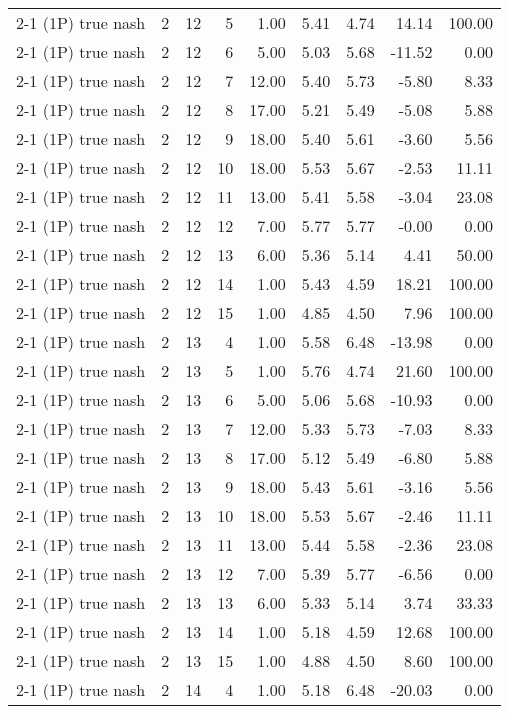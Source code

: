 \begin{tabular}{lrrrrrrrr}
2-1 (1P) true nash & 2 & 12 & 5 & 1.00 & 5.41 & 4.74 & 14.14 & 100.00 \\
2-1 (1P) true nash & 2 & 12 & 6 & 5.00 & 5.03 & 5.68 & -11.52 & 0.00 \\
2-1 (1P) true nash & 2 & 12 & 7 & 12.00 & 5.40 & 5.73 & -5.80 & 8.33 \\
2-1 (1P) true nash & 2 & 12 & 8 & 17.00 & 5.21 & 5.49 & -5.08 & 5.88 \\
2-1 (1P) true nash & 2 & 12 & 9 & 18.00 & 5.40 & 5.61 & -3.60 & 5.56 \\
2-1 (1P) true nash & 2 & 12 & 10 & 18.00 & 5.53 & 5.67 & -2.53 & 11.11 \\
2-1 (1P) true nash & 2 & 12 & 11 & 13.00 & 5.41 & 5.58 & -3.04 & 23.08 \\
2-1 (1P) true nash & 2 & 12 & 12 & 7.00 & 5.77 & 5.77 & -0.00 & 0.00 \\
2-1 (1P) true nash & 2 & 12 & 13 & 6.00 & 5.36 & 5.14 & 4.41 & 50.00 \\
2-1 (1P) true nash & 2 & 12 & 14 & 1.00 & 5.43 & 4.59 & 18.21 & 100.00 \\
2-1 (1P) true nash & 2 & 12 & 15 & 1.00 & 4.85 & 4.50 & 7.96 & 100.00 \\
2-1 (1P) true nash & 2 & 13 & 4 & 1.00 & 5.58 & 6.48 & -13.98 & 0.00 \\
2-1 (1P) true nash & 2 & 13 & 5 & 1.00 & 5.76 & 4.74 & 21.60 & 100.00 \\
2-1 (1P) true nash & 2 & 13 & 6 & 5.00 & 5.06 & 5.68 & -10.93 & 0.00 \\
2-1 (1P) true nash & 2 & 13 & 7 & 12.00 & 5.33 & 5.73 & -7.03 & 8.33 \\
2-1 (1P) true nash & 2 & 13 & 8 & 17.00 & 5.12 & 5.49 & -6.80 & 5.88 \\
2-1 (1P) true nash & 2 & 13 & 9 & 18.00 & 5.43 & 5.61 & -3.16 & 5.56 \\
2-1 (1P) true nash & 2 & 13 & 10 & 18.00 & 5.53 & 5.67 & -2.46 & 11.11 \\
2-1 (1P) true nash & 2 & 13 & 11 & 13.00 & 5.44 & 5.58 & -2.36 & 23.08 \\
2-1 (1P) true nash & 2 & 13 & 12 & 7.00 & 5.39 & 5.77 & -6.56 & 0.00 \\
2-1 (1P) true nash & 2 & 13 & 13 & 6.00 & 5.33 & 5.14 & 3.74 & 33.33 \\
2-1 (1P) true nash & 2 & 13 & 14 & 1.00 & 5.18 & 4.59 & 12.68 & 100.00 \\
2-1 (1P) true nash & 2 & 13 & 15 & 1.00 & 4.88 & 4.50 & 8.60 & 100.00 \\
2-1 (1P) true nash & 2 & 14 & 4 & 1.00 & 5.18 & 6.48 & -20.03 & 0.00 \\

\end{tabular}
